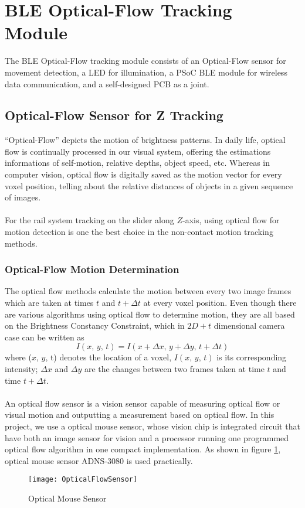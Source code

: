 \section{BLE Optical-Flow Tracking Module}
\label{BLE_OF_TrackingModule}
%
The BLE Optical-Flow tracking module consists of an Optical-Flow sensor for movement detection, a LED for illumination, a PSoC BLE module for wireless data communication, and a self-designed PCB as a joint.
%
\subsection{Optical-Flow Sensor for Z Tracking}
%
\enquote{Optical-Flow} depicts the motion of brightness patterns. In daily life, optical flow is continually processed in our visual system, offering the estimations informations of self-motion, relative depths, object speed, etc. Whereas in computer vision, optical flow is digitally saved as the motion vector for every voxel position, telling about the relative distances of objects in a given sequence of images.%
\\\\%
For the rail system tracking on the slider along \(Z\)-axis, using optical flow for motion detection is one the best choice in the non-contact motion tracking methods. 
%
\subsubsection{Optical-Flow Motion Determination}
%
The optical flow methods calculate the motion between every two image frames which are taken at times \(t\) and \( t+\Delta t\) at every voxel position. %
Even though there are various algorithms 
using optical flow to determine motion, they are all based on the Brightness Constancy Constraint, which in \(2D+t\) dimensional camera case can be written as 
%
\begin{equation}
%
I(x, \, y, \, t) = I(x + \Delta x, \, y + \Delta y, \, t + \Delta t)
%
\end{equation}
%
where (\(x\), \(y\), t) denotes the location of a voxel, \(I(x, \, y, \, t)\) is its corresponding intensity; \(\Delta x\) and \(\Delta y\) are the changes between two frames taken at time \(t\) and time \(t + \Delta t\).%
\\\\%
An optical flow sensor is a vision sensor capable of measuring optical flow or visual motion and outputting a measurement based on optical flow. In this project, we use a optical mouse sensor, whose vision chip is integrated circuit that have both an image sensor for vision and a processor running one programmed optical flow algorithm in one compact implementation. As shown in figure \ref{OpticalFlowSensor}, optical mouse sensor ADNS-3080 is used practically.
%
\begin{figure}[h]
\centering
\texttt{[image: OpticalFlowSensor]}
\caption{Optical Mouse Sensor}
\label{OpticalFlowSensor}
\end{figure}%
%
